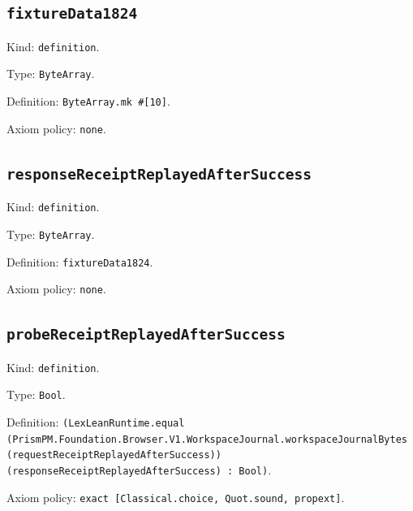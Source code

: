 \documentclass[11pt]{article}
\begin{document}
\subsection*{\texttt{fixtureData1824}}
\noindent Kind: \texttt{definition}.\par
\noindent Type: \texttt{ByteArray}.\par
\noindent Definition: \texttt{ByteArray.mk \#[10]}.\par
\noindent Axiom policy: \texttt{none}.\par
\subsection*{\texttt{responseReceiptReplayedAfterSuccess}}
\noindent Kind: \texttt{definition}.\par
\noindent Type: \texttt{ByteArray}.\par
\noindent Definition: \texttt{fixtureData1824}.\par
\noindent Axiom policy: \texttt{none}.\par
\subsection*{\texttt{probeReceiptReplayedAfterSuccess}}
\noindent Kind: \texttt{definition}.\par
\noindent Type: \texttt{Bool}.\par
\noindent Definition: \texttt{(LexLeanRuntime.equal (PrismPM.Foundation.Browser.V1.WorkspaceJournal.workspaceJournalBytes (requestReceiptReplayedAfterSuccess)) (responseReceiptReplayedAfterSuccess) : Bool)}.\par
\noindent Axiom policy: \texttt{exact [Classical.choice, Quot.sound, propext]}.\par
\end{document}
